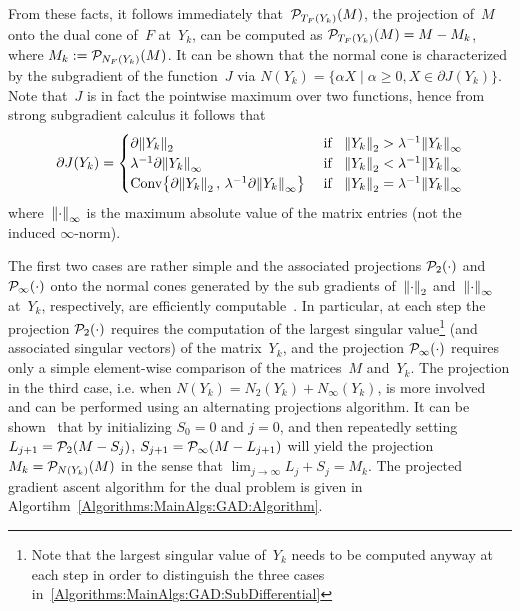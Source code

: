 \documentclass{../../common/projectreport}
\begin{document}
From these facts, it follows immediately that~${\mathcal{P}}_{T_F(Y_k)}(M)$, the projection of~$M$ onto the dual cone of~$F$ at~$Y_k$, can be computed as ${\mathcal{P}}_{T_F(Y_k)}(M) = M - M_k$, where $M_k := {\mathcal{P}}_{N_F(Y_k)}(M)$. It can be shown that the normal cone is characterized by the subgradient of the function~$J$ via $N(Y_k) = \{\alpha X \mid \alpha \geq0, X\in \partial J(Y_k) \}$. Note that~$J$ is in fact the pointwise maximum over two functions, hence from strong subgradient calculus it follows that
%
\begin{align}
\partial J(Y_k) = \begin{cases}  
\partial {\left\|Y_k\right\|}_{2}^{} &\text{ if }\;\; {\left\|Y_k\right\|}_{2}^{} > \lambda^{-1}{\left\|Y_k\right\|}_{\infty}^{} \\
\lambda^{-1} \partial {\left\|Y_k\right\|}_{\infty}^{} &\text{ if }\;\;  {\left\|Y_k\right\|}_{2}^{} < \lambda^{-1}{\left\|Y_k\right\|}_{\infty}^{} \\
\operatorname{Conv}\!\left\{\partial {\left\|Y_k\right\|}_{2}^{} \,,\, \lambda^{-1}\partial {\left\|Y_k\right\|}_{\infty}^{}\right\} &\text{ if }\;\; {\left\|Y_k\right\|}_{2}^{} = \lambda^{-1}{\left\|Y_k\right\|}_{\infty}^{} \\
\end{cases}
\label{Algorithms:MainAlgs:GAD:SubDifferential}
\end{align}
%
where~${\left\|\cdot\right\|}_{\infty}^{}$ is the maximum absolute value of the matrix entries (not the induced $\infty$-norm). 

The first two cases are rather simple and the associated projections ${\mathcal{P}}_{2}(\cdot)$ and ${\mathcal{P}}_{\infty}(\cdot)$ onto the normal cones generated by the sub gradients of~${\left\|\cdot\right\|}_{2}^{}$ and~${\left\|\cdot\right\|}_{\infty}^{}$ at~$Y_k$, respectively,  are efficiently computable~\cite{Lin:2009kx}. In particular, at each step the projection ${\mathcal{P}}_{2}(\cdot)$ requires the computation of the largest singular value\footnote{Note that the largest singular value of~$Y_k$ needs to be computed anyway at each step in order to distinguish the three cases in~\eqref{Algorithms:MainAlgs:GAD:SubDifferential}} (and associated singular vectors) of the matrix~$Y_k$, and the projection ${\mathcal{P}}_{\infty}(\cdot)$ requires only a simple element-wise comparison of the matrices~$M$ and~$Y_k$. The projection in the third case, i.e. when $N(Y_k) = N_2(Y_k) + N_\infty(Y_k)$, is more involved and can be performed using an alternating projections algorithm. It can be shown~\cite{Lin:2009kx} that by initializing $S_0 = 0$ and $j=0$, and then repeatedly setting $L_{j+1} = {\mathcal{P}}_{2}(M-S_j)$, $S_{j+1} = {\mathcal{P}}_{\infty}(M-L_{j+1})$ will yield the projection~$M_k = {\mathcal{P}}_{N(Y_k)}(M)$ in the sense that $\lim_{j\rightarrow \infty} L_j+S_j = M_k$. The projected gradient ascent algorithm for the dual problem is given in Algortihm~\eqref{Algorithms:MainAlgs:GAD:Algorithm}.
\end{document}
